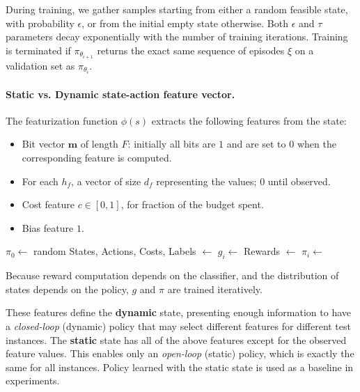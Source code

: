 During training, we gather samples starting from either a random feasible state, with probability $\epsilon$, or from the initial empty state otherwise.
Both $\epsilon$ and $\tau$ parameters decay exponentially with the number of training iterations.
Training is terminated if $\pi_{\theta_{i+1}}$ returns the exact same sequence of episodes $\xi$ on a validation set as $\pi_{\theta_{i}}$.

\vspace{-1em}
\paragraph{Static vs. Dynamic state-action feature vector.}\label{sec:policy_features}
The featurization function $\phi(s)$ extracts the following features from the state:
\begin{itemize}\addtolength{\itemsep}{-.5\baselineskip}
\item Bit vector $\textbf{m}$ of length $F$: initially all bits are $1$ and are set to $0$ when the corresponding feature is computed.
\item For each $h_f$, a vector of size $d_f$ representing the values; $0$ until observed.
\item Cost feature $c \in [0, 1]$, for fraction of the budget spent.
\item Bias feature $1$.
\end{itemize}

\begin{algorithm}[]

\SetAlgoLined
{}
\BlankLine
$\pi_0 \leftarrow$ random\;
 {
    States, Actions, Costs, Labels $\leftarrow$ \;
    $g_i \leftarrow$ \;
    Rewards $\leftarrow$ \;
    $\pi_i \leftarrow$ \;
}
\caption{Because reward computation depends on the classifier, and the distribution of states depends on the policy, $g$ and $\pi$ are trained iteratively.\label{alg:learning}}
\end{algorithm}

These features define the \textbf{dynamic} state, presenting enough information to have a \emph{closed-loop} (dynamic) policy that may select different features for different test instances.
The \textbf{static} state has all of the above features except for the observed feature values.
This enables only an \emph{open-loop} (static) policy, which is exactly the same for all instances.
Policy learned with the static state is used as a baseline in experiments.

